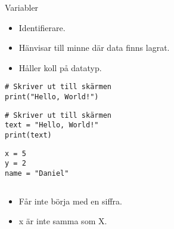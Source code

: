\begin{frame}[fragile]
  \inputminted[highlightlines={11-12,14,17,20,22,25,27-28},linenos,firstline=11]{python}{examples/age.py}
\end{frame}

\begin{frame}[fragile]
  \begin{block}{Variabler}
    \begin{itemize}
      \item Identifierare.
      \item Hänvisar till minne där data finns lagrat.
      \item Håller koll på datatyp.
    \end{itemize}
  \end{block}

  \pause

  \begin{example}
    \begin{verbatim}
# Skriver ut till skärmen
print("Hello, World!")
    \end{verbatim}
  \end{example}

  \begin{example}
    \begin{verbatim}
# Skriver ut till skärmen
text = "Hello, World!"
print(text)
    \end{verbatim}
  \end{example}
\end{frame}

\begin{frame}[fragile]
  \begin{example}[Variabler]
    \begin{verbatim}
x = 5
y = 2
name = "Daniel"
    \end{verbatim}
  \end{example}
\end{frame}

\begin{frame}[fragile]
  \inputminted[highlightlines={11-12,14,17,18,20,25,27-28},linenos,firstline=11]{python}{examples/age.py}
\end{frame}

\begin{frame}
  \begin{remark}
    \begin{itemize}
      \item Får inte börja med en siffra.
      \item x är inte samma som X.
    \end{itemize}
  \end{remark}
\end{frame}

